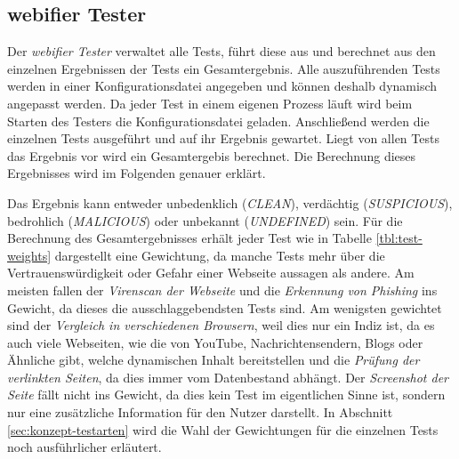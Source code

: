 \subsection{webifier Tester}
\label{sec:konzept-tester}

Der \textit{webifier Tester} verwaltet alle Tests, führt diese aus und berechnet aus den einzelnen
Ergebnissen der Tests ein Gesamtergebnis. Alle auszuführenden Tests werden in einer
Konfigurationsdatei angegeben und können deshalb dynamisch angepasst werden. Da jeder Test in einem
eigenen Prozess läuft wird beim Starten des Testers die Konfigurationsdatei geladen. Anschließend
werden die einzelnen Tests ausgeführt und auf ihr Ergebnis gewartet. Liegt von allen Tests das
Ergebnis vor wird ein Gesamtergebis berechnet. Die Berechnung dieses Ergebnisses wird im Folgenden
genauer erklärt.

Das Ergebnis kann entweder unbedenklich (\textit{CLEAN}), verdächtig (\textit{SUSPICIOUS}),
bedrohlich (\textit{MALICIOUS}) oder unbekannt (\textit{UNDEFINED}) sein. Für die Berechnung des
Gesamtergebnisses erhält jeder Test wie in Tabelle \ref{tbl:test-weights} dargestellt eine Gewichtung,
da manche Tests mehr über die Vertrauenswürdigkeit oder Gefahr einer Webseite aussagen als andere.
Am meisten fallen der \textit{Virenscan der Webseite} und die \textit{Erkennung von Phishing} ins
Gewicht, da dieses die ausschlaggebendsten Tests sind. Am wenigsten gewichtet sind der
\textit{Vergleich in verschiedenen Browsern}, weil dies nur ein Indiz ist, da es auch viele
Webseiten, wie die von YouTube, Nachrichtensendern, Blogs oder Ähnliche gibt, welche
dynamischen Inhalt bereitstellen und die \textit{Prüfung der verlinkten Seiten}, da dies immer vom
Datenbestand abhängt. Der \textit{Screenshot der Seite} fällt nicht ins Gewicht, da dies kein Test
im eigentlichen Sinne ist, sondern nur eine zusätzliche Information für den Nutzer darstellt. In
Abschnitt \ref{sec:konzept-testarten} wird die Wahl der Gewichtungen für die einzelnen Tests noch
ausführlicher erläutert.

